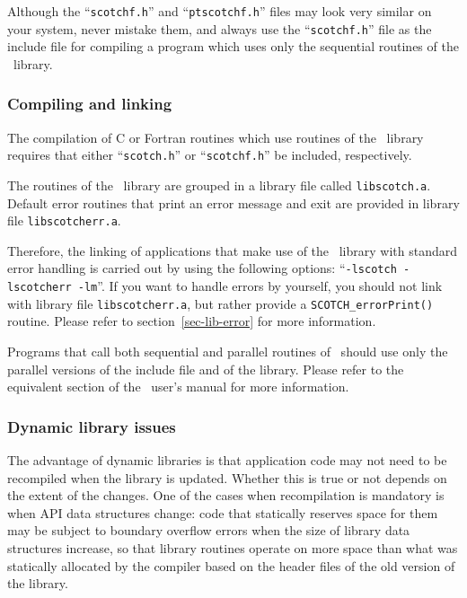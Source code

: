Although the ``{\tt scotchf.h}'' and ``{\tt ptscotchf.h}'' files may
look very similar on your system, never mistake them, and always use
the ``{\tt scotchf.h}'' file as the include file for compiling a
program which uses only the sequential routines of the \libscotch\
library.

\subsubsection{Compiling and linking}

The compilation of C or Fortran routines which use routines of
the \libscotch\ library requires that either ``{\tt scotch.h}'' or
``{\tt scotchf.h}'' be included, respectively.

The routines of the \libscotch\ library are grouped in a library
file called {\tt libscotch.a}. Default error routines that print
an error message and exit are provided in library file
{\tt libscotcherr.a}.

Therefore, the linking of applications that make use of the
\libscotch\ library with standard error handling is carried out by
using the following options: ``{\tt -lscotch -lscotcherr -lm}''.
If you want to handle errors by yourself, you should not link with
library file {\tt libscotcherr.a}, but rather provide a
{\tt SCOTCH\_\lbt error\lbt Print()} routine.
Please refer to section~\ref{sec-lib-error} for more information.

Programs that call both sequential and parallel routines of
\scotch\ should use only the parallel versions of the include file and
of the library. Please refer to the equivalent section of the
\ptscotch\ user's manual for more information.

\subsubsection{Dynamic library issues}
\label{sec-lib-dynalloc}

The advantage of dynamic libraries is that application code may not
need to be recompiled when the library is updated. Whether this is
true or not depends on the extent of the changes. One of the cases
when recompilation is mandatory is when API data structures change:
code that statically reserves space for them may be subject to
boundary overflow errors when the size of library data structures
increase, so that library routines operate on more space than what was
statically allocated by the compiler based on the header files of the
old version of the library.

